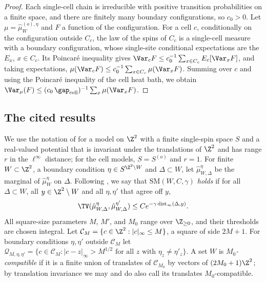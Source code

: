 \begin{proof}
Each single-cell chain is irreducible with positive transition probabilities on a finite space, and there are finitely many boundary configurations, so $c_0 > 0$. Let $\mu = \hat\mu^{(o), \eta}_W$ and $F$ a function of the configuration. For a cell $c$, conditionally on the configuration outside $C_c$, the law of the spins of $C_c$ is a single-cell measure with a boundary configuration, whose single-site conditional expectations are the $E_x$, $x \in C_c$. Its Poincar\'e inequality gives $\Var_c F \le c_0^{-1} \sum_{x \in C_c} E_c [\Var_x F]$, and taking expectations, $\mu(\Var_c F) \le c_0^{-1} \sum_{x \in C_c} \mu(\Var_x F)$. Summing over $c$ and using the Poincar\'e inequality of the cell heat bath, we obtain $\Var_\mu(F) \le (c_0 \, \gap_{\mathrm{cell}})^{-1} \sum_{x} \mu(\Var_x F)$.
\end{proof}

\subsection{The cited results}\label{s:cited}

We use the notation of \cite{MOS94} for a model on $\Z^2$ with a finite single-spin space $S$ and a real-valued potential that is invariant under the translations of $\Z^2$ and has range $r$ in the $\ell^\infty$ distance; for the cell models, $S = S^{(o)}$ and $r = 1$. For finite $W \subset \Z^2$, a boundary condition $\eta \in S^{\Z^2 \setminus W}$ and $\Delta \subset W$, let $\hat\mu^\eta_{W, \Delta}$ be the marginal of $\hat\mu^\eta_W$ on $\Delta$. Following \cite[(1.10)]{MOS94}, we say that \emph{$\mathrm{SM}(W, C, \gamma)$ holds} if for all $\Delta \subset W$, all $y \in \Z^2 \setminus W$ and all $\eta, \eta'$ that agree off $y$,
\begin{equation}\label{e:SM}
\TV(\hat\mu^\eta_{W, \Delta}, \hat\mu^{\eta'}_{W, \Delta}) \le C e^{-\gamma \operatorname{dist}_\infty(\Delta, y)} .
\end{equation}
All square-size parameters $M$, $M'$, and $M_0$ range over $\Z_{\ge0}$, and their thresholds are chosen integral. Let $\mathcal C_M = \{ c \in \Z^2 : |c|_\infty \le M\}$, a square of side $2M + 1$. For boundary conditions $\eta, \eta'$ outside $\mathcal C_M$ let $\mathcal Q_{M, \eta, \eta'} = \{ c \in \mathcal C_M : |c - z|_\infty > M^{1/2} \text{ for all } z \text{ with } \eta_z \neq \eta'_z \}$. A set $W$ is \emph{$M_0$-compatible} if it is a finite union of translates of $\mathcal C_{M_0}$ by vectors of $(2 M_0 + 1) \Z^2$; by translation invariance we may and do also call its translates $M_0$-compatible.

